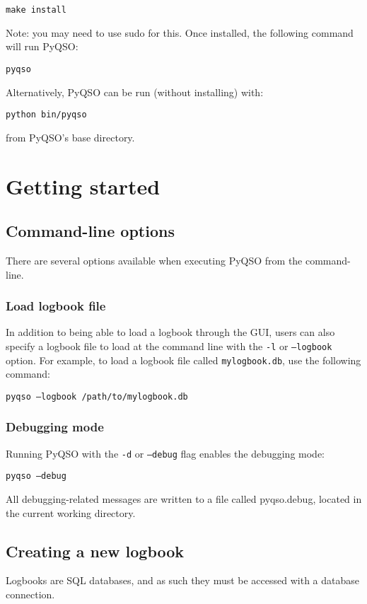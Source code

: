 \documentclass[11pt, a4paper]{report}
\begin{document}
  \texttt{make install}

\noindent Note: you may need to use sudo for this. Once installed, the following command will run PyQSO:

  \texttt{pyqso}

\noindent Alternatively, PyQSO can be run (without installing) with:

  \texttt{python bin/pyqso}

\noindent from PyQSO's base directory.



\chapter{Getting started}

\section{Command-line options}
There are several options available when executing PyQSO from the command-line.

\subsection{Load logbook file}
In addition to being able to load a logbook through the GUI, users can also specify a logbook file to load at the command line with the \texttt{-l} or \texttt{--logbook} option. For example, to load a logbook file called \texttt{mylogbook.db}, use the following command:

  \texttt{pyqso --logbook /path/to/mylogbook.db}

\subsection{Debugging mode}
Running PyQSO with the \texttt{-d} or \texttt{--debug} flag enables the debugging mode:

  \texttt{pyqso --debug}

\noindent All debugging-related messages are written to a file called pyqso.debug, located in the current working directory.


\section{Creating a new logbook}
Logbooks are SQL databases, and as such they must be accessed with a database connection.
\end{document}

